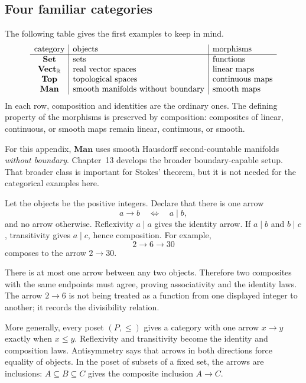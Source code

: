 \subsection{Four familiar categories}
The following table gives the first examples to keep in mind.
\[
\begin{array}{c|l|l}
\text{category}&\text{objects}&\text{morphisms}\\ \hline
\mathbf{Set}&\text{sets}&\text{functions}\\
\mathbf{Vect}_{\mathbb{R}}&\text{real vector spaces}&\text{linear maps}\\
\mathbf{Top}&\text{topological spaces}&\text{continuous maps}\\
\mathbf{Man}&\text{smooth manifolds without boundary}&\text{smooth maps}
\end{array}
\]
In each row, composition and identities are the ordinary ones. The defining
property of the morphisms is preserved by composition: composites of linear,
continuous, or smooth maps remain linear, continuous, or smooth.

For this appendix, $\mathbf{Man}$ uses smooth Hausdorff second-countable
manifolds \emph{without boundary}. Chapter~13 develops the broader
boundary-capable setup. That broader class is important for Stokes' theorem,
but it is not needed for the categorical examples here.

\begin{example}
Let the objects be the positive integers. Declare that there is one arrow
\[
a\longrightarrow b
\quad\Longleftrightarrow\quad
a\mid b,
\]
and no arrow otherwise. Reflexivity $a\mid a$ gives the identity arrow. If
$a\mid b$ and $b\mid c$, transitivity gives $a\mid c$, hence composition.
For example,
\[
2\longrightarrow6\longrightarrow30
\]
composes to the arrow $2\to30$.

There is at most one arrow between any two objects. Therefore two composites
with the same endpoints must agree, proving associativity and the identity
laws. The arrow $2\to6$ is not being treated as a function from one displayed
integer to another; it records the divisibility relation.
\end{example}

More generally, every poset $(P,\leq)$ gives a category with one arrow
$x\to y$ exactly when $x\leq y$. Reflexivity and transitivity become the
identity and composition laws. Antisymmetry says that arrows in both
directions force equality of objects. In the poset of subsets of a fixed set,
the arrows are inclusions: $A\subseteq B\subseteq C$ gives the composite
inclusion $A\to C$.

